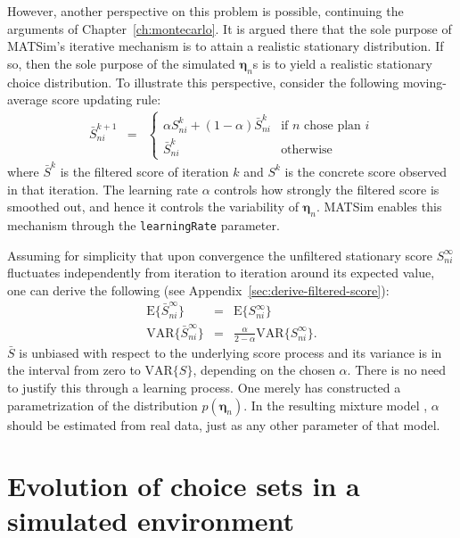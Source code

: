 However, another perspective on this problem is possible, continuing
the arguments of Chapter~\ref{ch:montecarlo}. It is argued there that
the sole purpose of MATSim's iterative mechanism is to attain a realistic
stationary distribution. If so, then the sole purpose of the simulated
$\boldsymbol{\eta}_n$s is to yield a realistic stationary choice distribution. To
illustrate this perspective, consider the following moving-average score
updating rule:
\begin{eqnarray}
\bar{S}_{ni}^{k+1} & = & \begin{cases}
\alpha S_{ni}^{k} + (1 - \alpha)\bar{S}_{ni}^{k} & \text{if }n\text{ chose plan }i\\
\bar{S}_{ni}^{k} & \text{otherwise}
\end{cases}
\end{eqnarray}
where $\bar{S}^{k}$ is the filtered score of iteration $k$ and $S^{k}$
is the concrete score observed in that iteration. The learning rate $\alpha$
controls how strongly the filtered score is smoothed out, and hence
it controls the variability of $\boldsymbol{\eta}_n$. MATSim enables this mechanism
through the \lstinline{learningRate} parameter.

Assuming for simplicity that upon convergence the unfiltered stationary score
$S_{ni}^{\infty}$ fluctuates independently from iteration to
iteration around its expected value, one can derive the following 
(see Appendix~\ref{sec:derive-filtered-score}): 
\begin{eqnarray}
\text{E}\{\bar{S}_{ni}^{\infty}\} & = & \text{E}\{S_{ni}^{\infty}\}\\
\text{VAR}\{\bar{S}_{ni}^{\infty}\} & = & \frac{\alpha}{2-\alpha}\text{VAR}\{S_{ni}^{\infty}\}.
\end{eqnarray}
$\bar{S}$ is unbiased with respect to the underlying score process
and its variance is in the interval from zero to $\text{VAR}\{S\}$,
depending on the chosen $\alpha$. There is no need to justify this
through a learning process. One merely has constructed a parametrization
of the distribution $p(\boldsymbol{\eta}_n)$. In the resulting
mixture model , $\alpha$ should be
estimated from real data, just as any other parameter of that model.


\section{\label{sec:Evolution-of-choice}Evolution of choice sets in a simulated
environment}

